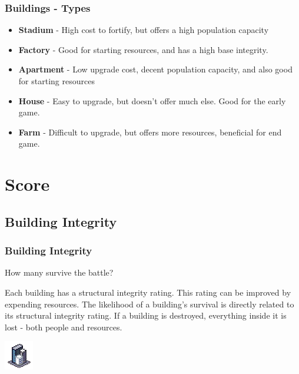 \documentclass[aspectratio=169]{beamer}
\begin{document}


\begin{frame}

  \frametitle{Buildings - Types}

  \begin{itemize}
  \item \textbf{Stadium} - High cost to fortify, but offers a high population capacity
  \item \textbf{Factory} - Good for starting resources, and has a high base integrity.
  \item \textbf{Apartment} - Low upgrade cost, decent population capacity, and also good
    for starting resources
  \item \textbf{House} - Easy to upgrade, but doesn't offer much else. Good for the early
    game.
  \item \textbf{Farm} - Difficult to upgrade, but offers more resources, beneficial for end
    game.
\end{itemize}

\end{frame}


\section{Score}

\subsection{Building Integrity}


\begin{frame}

  \frametitle{Building Integrity}

  \begin{center}
    {\large How many survive the battle?}
  \end{center}

  \begin{outline}
    \1 Each building has a structural integrity rating.
    \1 This rating can be improved by expending resources.
    \1 The likelihood of a building's survival is directly related to its
    structural integrity rating.
    \1 If a building is destroyed, everything inside it is lost - both people
    and resources.
  \end{outline}

  \begin{center}
    \includegraphics[scale=2.0]{../Images/Apartments.png}
  \end{center}

\end{frame}
\end{document}
